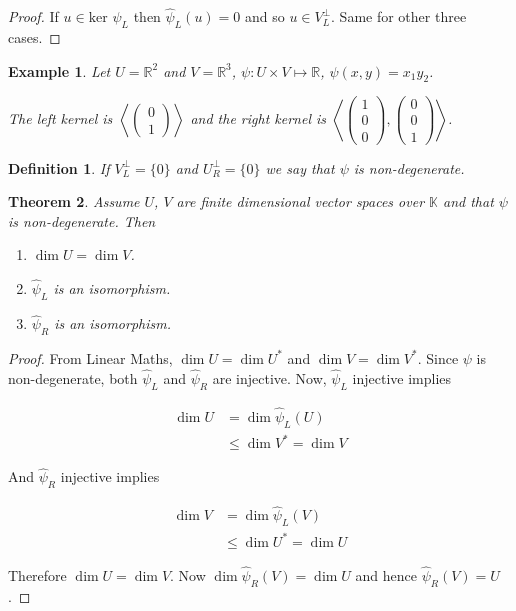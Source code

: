 \documentclass{notes}
\theoremstyle{plain}
\newtheorem{theorem}{Theorem}[chapter]
\newtheorem{definition}[theorem]{Definition}
\newtheorem*{example}{Example}
\begin{document}
\begin{proof}
  If $u \in \text{ker } \widehat{\psi}_{L}$ then
  $\widehat{\psi}_{L}(u)=0$ and so $u \in V_{L}^{\perp}$.  Same for
  other three cases.
\end{proof}

\begin{example}
  Let $U=\mathbb{R}^2$ and $V=\mathbb{R}^3$, $\psi : U \times V
  \mapsto \mathbb{R}$, $\psi(x,y) = x_{1}y_{2}$.
  
  The left kernel is $\left< \left(
\begin{matrix}
  0 \\
  1
\end{matrix}
\right) \right>$
and the right kernel is $\left< \left(
\begin{matrix}
  1 \\
  0 \\
  0
\end{matrix}
\right), \left(
\begin{matrix}
  0 \\
  0 \\
  1
\end{matrix}
\right) \right>$.
\end{example}

\begin{definition}
  If $V_{L}^{\perp} = \{0\}$ and $U_{R}^{\perp} = \{0\}$ we say that
  $\psi$ is \emph{non-degenerate}.
\end{definition}

\begin{theorem}
  Assume $U$, $V$ are finite dimensional vector spaces over
  $\mathbb{K}$ and that $\psi$ is non-degenerate.  Then

\begin{enumerate}
\item $\dim U = \dim V$.
\item $\widehat{\psi}_{L}$ is an isomorphism.
\item $\widehat{\psi}_{R}$ is an isomorphism.
\end{enumerate}
\end{theorem}

\begin{proof}
  From Linear Maths, $\dim U = \dim U^*$ and $\dim V = \dim V^*$.
  Since $\psi$ is non-degenerate, both $\widehat{\psi}_{L}$ and
  $\widehat{\psi}_{R}$ are injective.  Now, $\widehat{\psi}_{L}$
  injective implies

\begin{align*}
  \dim U &= \dim \widehat{\psi}_{L}(U) \\
  &\le \dim V^* = \dim V
\end{align*}

And $\widehat{\psi}_{R}$ injective implies

\begin{align*}
  \dim V &= \dim \widehat{\psi}_{L}(V) \\
  &\le \dim U^* = \dim U
\end{align*}

Therefore $\dim U = \dim V$.  Now $\dim \widehat{\psi}_{R}(V) =
\dim U$ and hence $\widehat{\psi}_{R}(V) = U$.
\end{proof}
\end{document}
